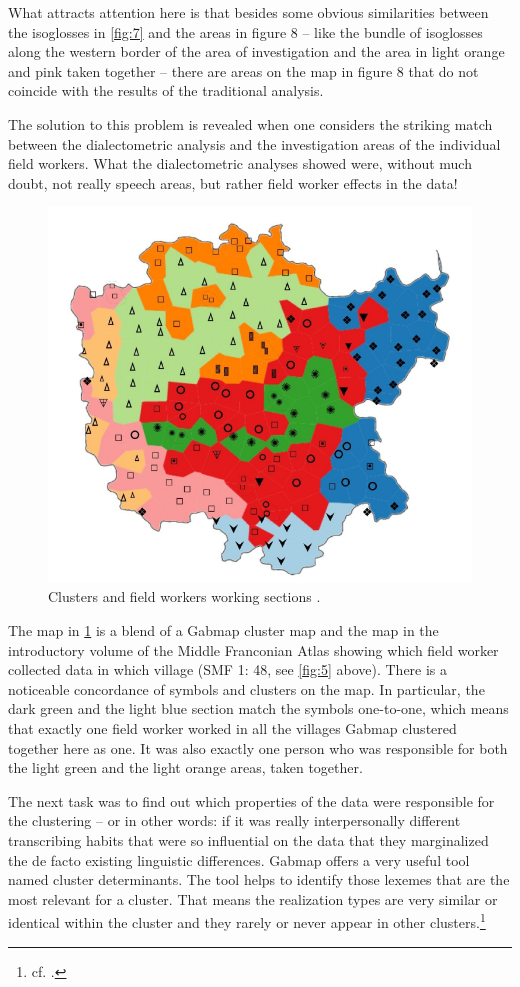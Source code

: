 \documentclass[output=paper]{LSP/langsci}
\begin{document}
What attracts attention here is that besides some obvious similarities between the isoglosses in \ref{fig:7} and the areas in figure 8 – like the bundle of isoglosses along the western border of the area of investigation and the area in light orange and pink taken together – there are areas on the map in figure 8 that do not coincide with the results of the traditional analysis.

The solution to this problem is revealed when one considers the striking match between the dialectometric analysis and the investigation areas of the individual field workers. What the dialectometric analyses showed were, without much doubt, not really speech areas, but rather field worker effects in the data!

\begin{figure}
\includegraphics[width=.7\textwidth]{illustrations/mathus_fig8}
\caption{Clusters and field worker{\textquotesingle}s working sections \citep[216]{mathussek_sprachraume_2014}.}
\label{fig:8}
\end{figure}

The map in \ref{fig:8} is a blend of a Gabmap cluster map and the map in the introductory volume of the Middle Franconian Atlas showing which field worker collected data in which village (SMF 1: 48, see \ref{fig:5} above). There is a noticeable concordance of symbols and clusters on the map. In particular, the dark green and the light blue section match the symbols one-to-one, which means that exactly one field worker worked in all the villages Gabmap clustered together here as one. It was also exactly one person who was responsible for both the light green and the light orange areas, taken together.

The next task was to find out which properties of the data were responsible for the clustering – or in other words: if it was really interpersonally different transcribing habits that were so influential on the data that they marginalized the de facto existing linguistic differences. Gabmap offers a very useful tool named cluster determinants. The tool helps to identify those lexemes that are the most relevant for a cluster. That means the realization types are very similar or identical within the cluster and they rarely or never appear in other clusters.\footnote{cf. \citet{nerbonne_gabmap_2011}.}
\end{document}
